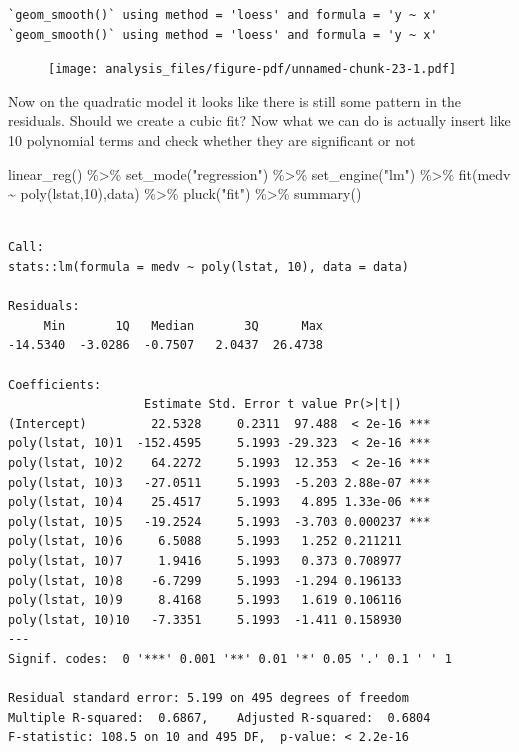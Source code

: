 \documentclass[
  letterpaper,
  DIV=11,
  numbers=noendperiod]{scrreprt}
\newenvironment{Shaded}{\begin{snugshade}}{\end{snugshade}}
\newcommand{\DecValTok}[1]{\textcolor[rgb]{0.47,0.16,0.63}{#1}}
\newcommand{\FunctionTok}[1]{\textcolor[rgb]{0.02,0.16,0.49}{#1}}
\newcommand{\NormalTok}[1]{\textcolor[rgb]{0.33,0.33,0.33}{#1}}
\newcommand{\SpecialCharTok}[1]{\textcolor[rgb]{0.00,0.46,0.62}{#1}}
\newcommand{\StringTok}[1]{\textcolor[rgb]{0.00,0.50,0.00}{#1}}
\begin{document}
\begin{verbatim}
`geom_smooth()` using method = 'loess' and formula = 'y ~ x'
`geom_smooth()` using method = 'loess' and formula = 'y ~ x'
\end{verbatim}

\begin{figure}[H]

{\centering \texttt{[image: analysis\_files/figure-pdf/unnamed-chunk-23-1.pdf]}

}

\end{figure}

Now on the quadratic model it looks like there is still some pattern in
the residuals. Should we create a cubic fit? Now what we can do is
actually insert like 10 polynomial terms and check whether they are
significant or not

\begin{Shaded}
\begin{Highlighting}[]
\FunctionTok{linear\_reg}\NormalTok{() }\SpecialCharTok{\%\textgreater{}\%} 
  \FunctionTok{set\_mode}\NormalTok{(}\StringTok{"regression"}\NormalTok{) }\SpecialCharTok{\%\textgreater{}\%} 
  \FunctionTok{set\_engine}\NormalTok{(}\StringTok{"lm"}\NormalTok{) }\SpecialCharTok{\%\textgreater{}\%} 
  \FunctionTok{fit}\NormalTok{(medv }\SpecialCharTok{\textasciitilde{}} \FunctionTok{poly}\NormalTok{(lstat,}\DecValTok{10}\NormalTok{),data) }\SpecialCharTok{\%\textgreater{}\%} 
  \FunctionTok{pluck}\NormalTok{(}\StringTok{"fit"}\NormalTok{) }\SpecialCharTok{\%\textgreater{}\%} 
  \FunctionTok{summary}\NormalTok{()}
\end{Highlighting}
\end{Shaded}

\begin{verbatim}

Call:
stats::lm(formula = medv ~ poly(lstat, 10), data = data)

Residuals:
     Min       1Q   Median       3Q      Max 
-14.5340  -3.0286  -0.7507   2.0437  26.4738 

Coefficients:
                   Estimate Std. Error t value Pr(>|t|)    
(Intercept)         22.5328     0.2311  97.488  < 2e-16 ***
poly(lstat, 10)1  -152.4595     5.1993 -29.323  < 2e-16 ***
poly(lstat, 10)2    64.2272     5.1993  12.353  < 2e-16 ***
poly(lstat, 10)3   -27.0511     5.1993  -5.203 2.88e-07 ***
poly(lstat, 10)4    25.4517     5.1993   4.895 1.33e-06 ***
poly(lstat, 10)5   -19.2524     5.1993  -3.703 0.000237 ***
poly(lstat, 10)6     6.5088     5.1993   1.252 0.211211    
poly(lstat, 10)7     1.9416     5.1993   0.373 0.708977    
poly(lstat, 10)8    -6.7299     5.1993  -1.294 0.196133    
poly(lstat, 10)9     8.4168     5.1993   1.619 0.106116    
poly(lstat, 10)10   -7.3351     5.1993  -1.411 0.158930    
---
Signif. codes:  0 '***' 0.001 '**' 0.01 '*' 0.05 '.' 0.1 ' ' 1

Residual standard error: 5.199 on 495 degrees of freedom
Multiple R-squared:  0.6867,    Adjusted R-squared:  0.6804 
F-statistic: 108.5 on 10 and 495 DF,  p-value: < 2.2e-16
\end{verbatim}
\end{document}

